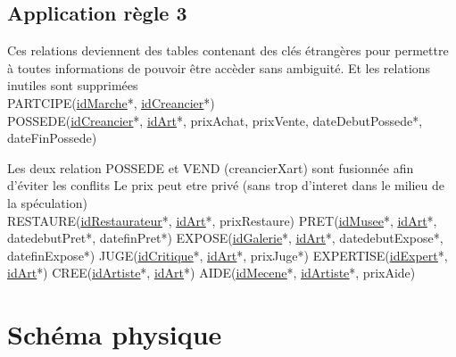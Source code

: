 \documentclass{article}
\begin{document}
\subsection{Application règle 3}

Ces relations deviennent des tables contenant des clés étrangères pour permettre à toutes informations de pouvoir être accèder sans ambiguité.
Et les relations inutiles sont supprimées 
\\
PARTCIPE(\underline{\underline{idMarche}}*, \underline{\underline{idCreancier}}*)
\\
POSSEDE(\underline{\underline{idCreancier}}*, \underline{\underline{idArt}}*, prixAchat, prixVente, dateDebutPossede*, dateFinPossede) \newline

Les deux relation POSSEDE et VEND (creancierXart) sont fusionnée afin d'éviter les conflits \newline
Le prix peut etre privé (sans trop d'interet dans le milieu de la spéculation) \newline
\\
RESTAURE(\underline{\underline{idRestaurateur}}*, \underline{\underline{idArt}}*, prixRestaure) \newline
PRET(\underline{\underline{idMusee}}*, \underline{\underline{idArt}}*, datedebutPret*, datefinPret*) \newline
EXPOSE(\underline{\underline{idGalerie}}*, \underline{\underline{idArt}}*, datedebutExpose*, datefinExpose*) \newline
JUGE(\underline{\underline{idCritique}}*, \underline{\underline{idArt}}*, prixJuge*) \newline
EXPERTISE(\underline{\underline{idExpert}}*, \underline{\underline{idArt}}*) \newline
CREE(\underline{\underline{idArtiste}}*, \underline{\underline{idArt}}*) \newline
AIDE(\underline{\underline{idMecene}}*, \underline{\underline{idArtiste}}*, prixAide) \newline


\clearpage


\section{Schéma physique}
\end{document}

